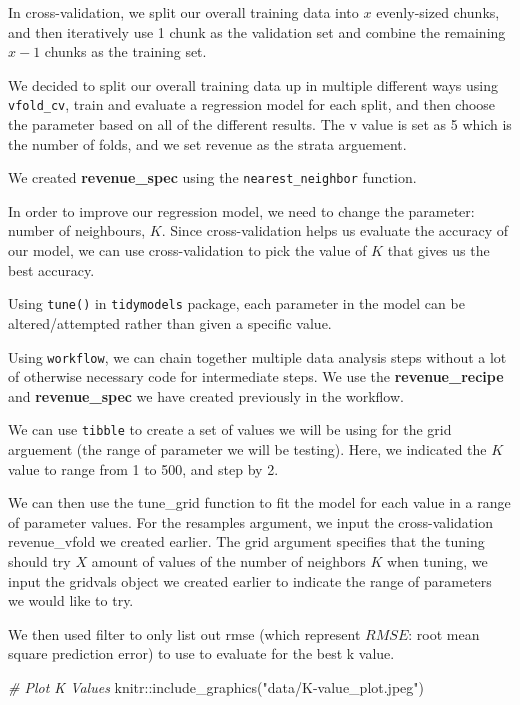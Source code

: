 \documentclass[
]{article}
\newenvironment{Shaded}{\begin{snugshade}}{\end{snugshade}}
\newcommand{\CommentTok}[1]{\textcolor[rgb]{0.56,0.35,0.01}{\textit{#1}}}
\newcommand{\FunctionTok}[1]{\textcolor[rgb]{0.00,0.00,0.00}{#1}}
\newcommand{\NormalTok}[1]{#1}
\newcommand{\SpecialCharTok}[1]{\textcolor[rgb]{0.00,0.00,0.00}{#1}}
\newcommand{\StringTok}[1]{\textcolor[rgb]{0.31,0.60,0.02}{#1}}
\begin{document}
In cross-validation, we split our overall training data into \(x\)
evenly-sized chunks, and then iteratively use 1 chunk as the validation
set and combine the remaining \(x-1\) chunks as the training set.

We decided to split our overall training data up in multiple different
ways using \texttt{vfold\_cv}, train and evaluate a regression model for
each split, and then choose the parameter based on all of the different
results. The v value is set as 5 which is the number of folds, and we
set revenue as the strata arguement.

We created \textbf{revenue\_spec} using the \texttt{nearest\_neighbor}
function.

In order to improve our regression model, we need to change the
parameter: number of neighbours, \(K\). Since cross-validation helps us
evaluate the accuracy of our model, we can use cross-validation to pick
the value of \(K\) that gives us the best accuracy.

Using \texttt{tune()} in \texttt{tidymodels} package, each parameter in
the model can be altered/attempted rather than given a specific value.

Using \texttt{workflow}, we can chain together multiple data analysis
steps without a lot of otherwise necessary code for intermediate steps.
We use the \textbf{revenue\_recipe} and \textbf{revenue\_spec} we have
created previously in the workflow.

We can use \texttt{tibble} to create a set of values we will be using
for the grid arguement (the range of parameter we will be testing).
Here, we indicated the \(K\) value to range from 1 to 500, and step by
2.

We can then use the tune\_grid function to fit the model for each value
in a range of parameter values. For the resamples argument, we input the
cross-validation revenue\_vfold we created earlier. The grid argument
specifies that the tuning should try \(X\) amount of values of the
number of neighbors \(K\) when tuning, we input the gridvals object we
created earlier to indicate the range of parameters we would like to
try.

We then used filter to only list out rmse (which represent \(RMSE\):
root mean square prediction error) to use to evaluate for the best k
value.

\begin{Shaded}
\begin{Highlighting}[]
\CommentTok{\# Plot K Values}
\NormalTok{knitr}\SpecialCharTok{::}\FunctionTok{include\_graphics}\NormalTok{(}\StringTok{"data/K{-}value\_plot.jpeg"}\NormalTok{)}
\end{Highlighting}
\end{Shaded}
\end{document}
